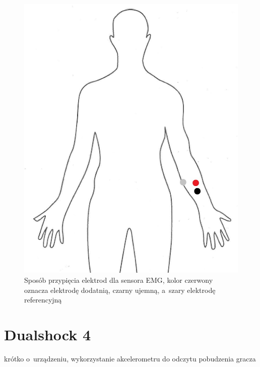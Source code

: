 \begin{figure}
	\centering
	\includegraphics[height=0.3\textheight]{images/bitalino_placement.jpg}
	\caption{Sposób przypięcia elektrod dla sensora EMG,  kolor czerwony oznacza elektrodę dodatnią, czarny ujemną, a~szary elektrodę referencyjną}
	\label{fig:bitalino_placement}
\end{figure}

\section{Dualshock 4}
krótko o~urządzeniu, wykorzystanie akcelerometru do odczytu pobudzenia gracza
